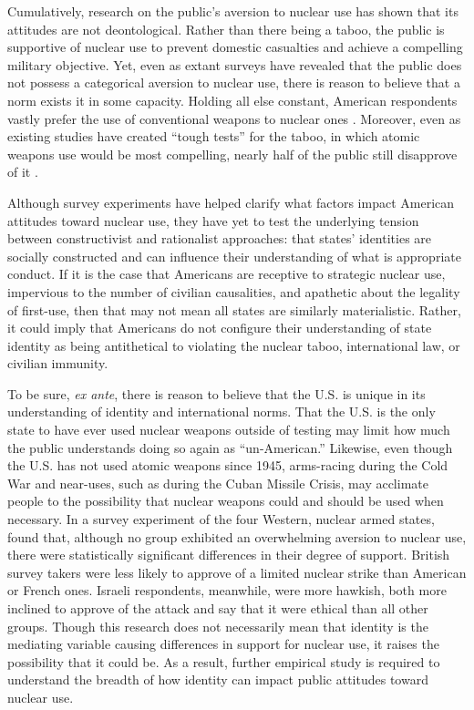 \documentclass[12pt]{article}
\begin{document}
Cumulatively, research on the public's aversion to nuclear use has shown that its attitudes are not deontological. Rather than there being a taboo, the public is supportive of nuclear use to prevent domestic casualties and achieve a compelling military objective. Yet, even as extant surveys have revealed that the public does not possess a categorical aversion to nuclear use, there is reason to believe that a norm exists it in some capacity. Holding all else constant, American respondents vastly prefer the use of conventional weapons to nuclear ones \citep{press_atomic_2013}. Moreover, even as existing studies have created “tough tests” for the taboo, in which atomic weapons use would be most compelling, nearly half of the public still disapprove of it \citep{sagan_revisiting_2017}.

Although survey experiments have helped clarify what factors impact American attitudes toward nuclear use, they have yet to test the underlying tension between constructivist and rationalist approaches: that states' identities are socially constructed and can influence their understanding of what is appropriate conduct. If it is the case that Americans are receptive to strategic nuclear use, impervious to the number of civilian causalities, and apathetic about the legality of first-use, then that may not mean all states are similarly materialistic. Rather, it could imply that Americans do not configure their understanding of state identity as being antithetical to violating the nuclear taboo, international law, or civilian immunity.

To be sure, \textit{ex ante}, there is reason to believe that the U.S. is unique in its understanding of identity and international norms. That the U.S. is the only state to have ever used nuclear weapons outside of testing may limit how much the public understands doing so again as “un-American.” Likewise, even though the U.S. has not used atomic weapons since 1945, arms-racing during the Cold War and near-uses, such as during the Cuban Missile Crisis, may acclimate people to the possibility that nuclear weapons could and should be used when necessary. In a survey experiment of the four Western, nuclear armed states, \citet{dill_kettles_2022} found that, although no group exhibited an overwhelming aversion to nuclear use, there were statistically significant differences in their degree of support. British survey takers were less likely to approve of a limited nuclear strike than American or French ones. Israeli respondents, meanwhile, were more hawkish, both more inclined to approve of the attack and say that it were ethical than all other groups. Though this research does not necessarily mean that identity is the mediating variable causing differences in support for nuclear use, it raises the possibility that it could be. As a result, further empirical study is required to understand the breadth of how identity can impact public attitudes toward nuclear use.
\end{document}
